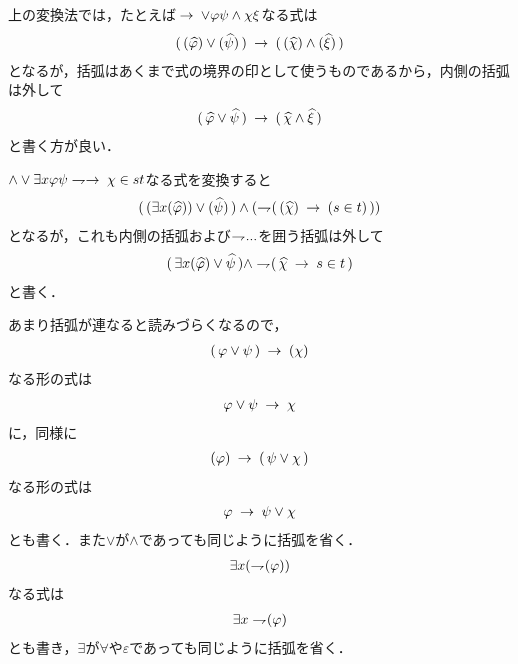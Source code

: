 	上の変換法では，たとえば$\hspace{0.25em}\rightarrow\hspace{0.25em} \vee \varphi \psi \wedge \chi \xi$なる式は
	\begin{align}
		(\, (\widehat{\varphi}) \vee (\widehat{\psi})\, ) 
		\hspace{0.25em}\rightarrow\hspace{0.25em} (\, (\widehat{\chi}) \wedge (\widehat{\xi})\, )
	\end{align}
	となるが，括弧はあくまで式の境界の印として使うものであるから，内側の括弧は外して
	\begin{align}
		(\, \widehat{\varphi} \vee \widehat{\psi}\, ) 
		\hspace{0.25em}\rightarrow\hspace{0.25em} (\, \widehat{\chi} \wedge \widehat{\xi}\, )
	\end{align}
	と書く方が良い．
	
	$\wedge \vee \exists x \varphi \psi \negation \rarrow \chi \in s t$なる式を変換すると
	\begin{align}
		(\, (\exists x (\widehat{\varphi})) \vee (\widehat{\psi})\, ) \wedge (\rightharpoondown\hspace{-0.25em} (\, (\widehat{\chi}) \hspace{0.25em}\rightarrow\hspace{0.25em} (s \in t)\, ))
	\end{align}
	となるが，これも内側の括弧および$\rightharpoondown\hspace{-0.25em} ...$を囲う括弧は外して
	\begin{align}
		(\, \exists x (\widehat{\varphi}) \vee \widehat{\psi}\, ) \wedge \rightharpoondown\hspace{-0.25em} (\, \widehat{\chi} \hspace{0.25em}\rightarrow\hspace{0.25em} s \in t\, )
	\end{align}
	と書く．
	
	あまり括弧が連なると読みづらくなるので，
	\begin{align}
		(\, \varphi \vee \psi\, ) \hspace{0.25em}\rightarrow\hspace{0.25em} (\chi)
	\end{align}
	なる形の式は
	\begin{align}
		\varphi \vee \psi \hspace{0.25em}\rightarrow\hspace{0.25em} \chi
	\end{align}
	に，同様に
	\begin{align}
		(\varphi) \hspace{0.25em}\rightarrow\hspace{0.25em} (\, \psi \vee \chi\, )
	\end{align}
	なる形の式は
	\begin{align}
		\varphi \hspace{0.25em}\rightarrow\hspace{0.25em} \psi \vee \chi
	\end{align}
	とも書く．また$\vee$が$\wedge$であっても同じように括弧を省く．
	\begin{align}
		\exists x (\rightharpoondown\hspace{-0.25em} (\varphi))
	\end{align}
	なる式は
	\begin{align}
		\exists x \rightharpoondown\hspace{-0.25em} (\varphi)
	\end{align}
	とも書き，$\exists$が$\forall$や$\varepsilon$であっても同じように括弧を省く．